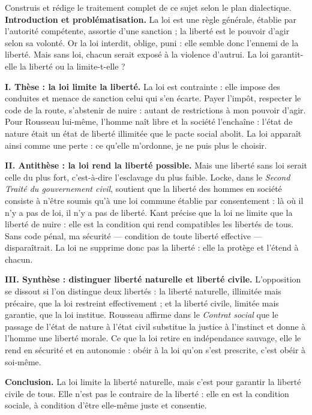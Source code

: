 \documentclass[11pt]{article}
\newcommand{\cle}[1]{{\popxbold\color{popdark}#1}}
\begin{document}
\begin{exoresolu}
Construis et rédige le traitement complet de ce sujet selon le plan dialectique.
\tcblower
\textbf{Introduction et problématisation.} La \cle{loi} est une règle générale, établie par l'autorité compétente, assortie d'une sanction ; la \cle{liberté} est le pouvoir d'agir selon sa volonté. Or la loi interdit, oblige, puni : elle semble donc l'ennemi de la liberté. Mais sans loi, chacun serait exposé à la violence d'autrui. La loi garantit-elle la liberté ou la limite-t-elle ?

\textbf{I. Thèse : la loi limite la liberté.} La loi est \cle{contrainte} : elle impose des conduites et menace de \cle{sanction} celui qui s'en écarte. Payer l'impôt, respecter le code de la route, s'abstenir de nuire : autant de restrictions à mon pouvoir d'agir. Pour Rousseau lui-même, l'homme naît libre et la société l'enchaîne : l'état de nature était un état de liberté illimitée que le pacte social abolit. La loi apparaît ainsi comme une perte : ce qu'elle m'ordonne, je ne puis plus le choisir.

\textbf{II. Antithèse : la loi rend la liberté possible.} Mais une liberté sans loi serait celle du plus fort, c'est-à-dire l'esclavage du plus faible. Locke, dans le \emph{Second Traité du gouvernement civil}, soutient que la liberté des hommes en société consiste à n'être soumis qu'à une loi commune établie par consentement : là où il n'y a pas de loi, il n'y a pas de liberté. Kant précise que la loi ne limite que la liberté de nuire : elle est la condition qui rend compatibles les libertés de tous. Sans code pénal, ma sécurité — condition de toute liberté effective — disparaîtrait. La loi ne supprime donc pas la liberté : elle la protège et l'étend à chacun.

\textbf{III. Synthèse : distinguer liberté naturelle et liberté civile.} L'opposition se dissout si l'on distingue deux libertés : la \cle{liberté naturelle}, illimitée mais précaire, que la loi restreint effectivement ; et la \cle{liberté civile}, limitée mais garantie, que la loi institue. Rousseau affirme dans le \emph{Contrat social} que le passage de l'état de nature à l'état civil substitue la justice à l'instinct et donne à l'homme une liberté morale. Ce que la loi retire en indépendance sauvage, elle le rend en sécurité et en autonomie : obéir à la loi qu'on s'est prescrite, c'est obéir à soi-même.

\textbf{Conclusion.} La loi limite la liberté naturelle, mais c'est pour garantir la liberté civile de tous. Elle n'est pas le contraire de la liberté : elle en est la condition sociale, à condition d'être elle-même juste et consentie.
\end{exoresolu}
\end{document}
